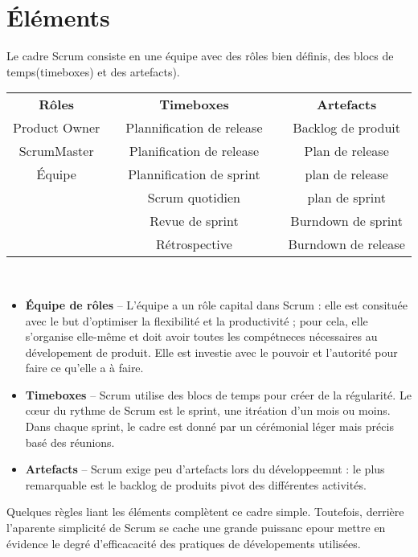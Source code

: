\documentclass[12pt,a4paper,openany]{article}
\begin{document}
	\section{Éléments}
	Le cadre Scrum consiste en une équipe avec des rôles bien définis, des blocs de temps(timeboxes) et des artefacts).\\
	\begin{center}
	\begin{tabular}{|c|p{0.5cm}|c|p{0.5cm}|c|}
		\hline
		\textbf{Rôles} && \textbf{Timeboxes} && \textbf{Artefacts}\\
		Product Owner && Plannification de release && Backlog de produit\\
		ScrumMaster && Planification de release&&Plan de release \\
		Équipe && Plannification de sprint && plan de release\\
		&& Scrum quotidien && plan de sprint\\
		&&Revue de sprint && Burndown de sprint\\
		&&Rétrospective && Burndown de release\\
		\hline
	\end{tabular}\\
\end{center}
	\begin{itemize}
		\item\textbf{ Équipe de rôles} -- L'équipe a un rôle capital dans Scrum : elle est consituée avec le but d'optimiser la flexibilité et la productivité ; pour cela, elle s'organise elle-même et doit
			avoir toutes les compétneces nécessaires au dévelopement de produit. Elle est investie avec le pouvoir et l'autorité pour faire ce qu'elle a à faire.
		\item \textbf{Timeboxes} -- Scrum utilise des blocs de temps pour créer de la régularité. Le c\oe{}ur du rythme de Scrum est le sprint, une itréation d'un mois ou moins. Dans chaque sprint, le cadre est donné par un cérémonial léger mais précis basé des réunions.
		\item \textbf{Artefacts} -- Scrum exige peu d'artefacts lors du développeemnt : le plus remarquable est le backlog de produits pivot des différentes activités.
	\end{itemize}
	Quelques règles liant les éléments complètent ce cadre simple. Toutefois, derrière l'aparente simplicité de Scrum se cache une grande puissanc epour mettre en évidence le degré d'efficacacité des pratiques
	de dévelopements utilisées.
			
\end{document}
